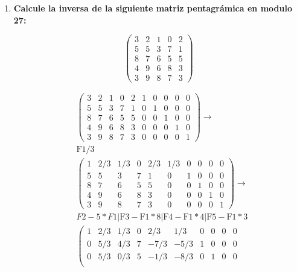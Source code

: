 \documentclass{article}
\begin{document}
\begin{enumerate}
\item \textbf{Calcule la inversa de la siguiente matriz pentagrámica en modulo 27:}

\begin{equation*}
\left(
    \begin{array}{ccccc}
    3 & 2 & 1 & 0 & 2  \\
    5 & 5 & 3 & 7 & 1  \\
    8 & 7 & 6 & 5 & 5  \\
    4 & 9 & 6 & 8 & 3  \\
    3 & 9 & 8 & 7 & 3 
   \end{array} \right)
\end{equation*}


\begin{equation*}
    \begin{split}
     &  \left(
    \begin{array}{ccccc|ccccc}
    3 & 2 & 1 & 0 & 2 & 1 & 0 & 0 & 0 & 0 \\
    5 & 5 & 3 & 7 & 1 & 0 & 1 & 0 & 0 & 0 \\
    8 & 7 & 6 & 5 & 5 & 0 & 0 & 1 & 0 & 0 \\
    4 & 9 & 6 & 8 & 3 & 0 & 0 & 0 & 1 & 0 \\
    3 & 9 & 8 & 7 & 3 & 0 & 0 & 0 & 0 & 1
    \end{array}
    \right) \rightarrow\\ 
    & \text{F}1/3 \\ 
    &  \left(
    \begin{array}{ccccc|ccccc}
    1 & 2/3 & 1/3 & 0 & 2/3 & 1/3 & 0 & 0 & 0 & 0 \\
    5 & 5 & 3 & 7 & 1 & 0 & 1 & 0 & 0 & 0 \\
    8 & 7 & 6 & 5 & 5 & 0 & 0 & 1 & 0 & 0 \\
    4 & 9 & 6 & 8 & 3 & 0 & 0 & 0 & 1 & 0 \\
    3 & 9 & 8 & 7 & 3 & 0 & 0 & 0 & 0 & 1
    \end{array}
    \right) \rightarrow  \\
    & F2-5*F1 \vert \text{F}3-\text{F}1*8 \vert \text{F}4-\text{F}1*4 \vert \text{F}5-\text{F}1*3\\
    &  \left(
    \begin{array}{ccccc|ccccc}
    1 & 2/3 & 1/3 & 0 & 2/3 & 1/3 & 0 & 0 & 0 & 0 \\
    0 & 5/3 & 4/3 & 7 & -7/3 & -5/3 & 1 & 0 & 0 & 0 \\
    0 & 5/3 & 0/3 & 5 & -1/3 & -8/3 & 0 & 1 & 0 & 0 \\

\end{array}
\end{split}
\end{equation*}
\end{enumerate}
\end{document}
